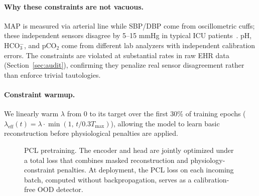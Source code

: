 \documentclass{article}
\begin{document}
\paragraph{Why these constraints are not vacuous.}
MAP is measured via arterial line while SBP/DBP come from oscillometric cuffs; these independent sensors disagree by 5--15 mmHg in typical ICU patients~\citep{wax2011invasive}.
pH, HCO$_3^-$, and pCO$_2$ come from different lab analyzers with independent calibration errors.
The constraints are violated at substantial rates in raw EHR data (Section~\ref{sec:audit}), confirming they penalize real sensor disagreement rather than enforce trivial tautologies.

\paragraph{Constraint warmup.}
We linearly warm $\lambda$ from 0 to its target over the first 30\% of training epochs ($\lambda_{\text{eff}}(t) = \lambda \cdot \min(1,\, t / 0.3 T_{\text{max}})$), allowing the model to learn basic reconstruction before physiological penalties are applied.

\begin{figure}[t]
\centering
{}
\caption{PCL pretraining. The encoder and head are jointly optimized under a total loss that combines masked reconstruction and physiology-constraint penalties. At deployment, the PCL loss on each incoming batch, computed without backpropagation, serves as a calibration-free OOD detector.}
\label{fig:method}
\end{figure}
\end{document}

